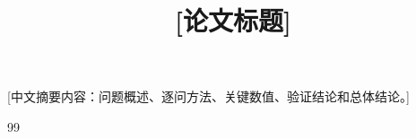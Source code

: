 \documentclass[withoutpreface,bwprint]{cumcmthesis}
\title{[论文标题]}
\makeatletter
\renewenvironment{abstract}{%
  \if@twocolumn\section*{\abstractname}%
  \else\begin{center}{\zihao{4}\bfseries \abstractname\vspace{-.5em}\vspace{\z@}}\end{center}\quotation\fi
}{\if@twocolumn\else\endquotation\newpage\fi}
\makeatother
\begin{document}
\maketitle
\begin{abstract}
[中文摘要内容：问题概述、逐问方法、关键数值、验证结论和总体结论。]
\keywords{[关键词1]\quad [关键词2]\quad [关键词3]\quad [关键词4]}
\end{abstract}
\tableofcontents
\clearpage









\begin{thebibliography}{99}
\end{thebibliography}
\begin{appendices}

\end{appendices}
\end{document}
